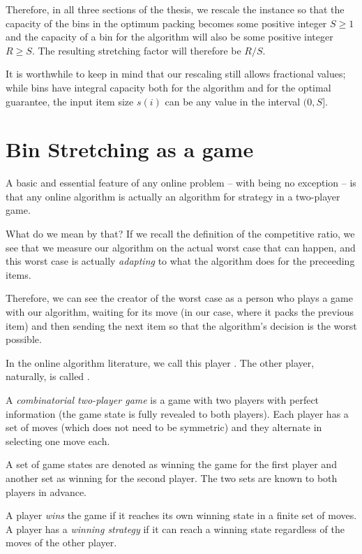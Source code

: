 Therefore, in all three sections of the thesis, we rescale the
instance so that the capacity of the bins in the optimum packing
becomes some positive integer $S \ge 1$ and the capacity of a bin for
the algorithm will also be some positive integer $R \ge S$. The
resulting stretching factor will therefore be $R/S$.

It is worthwhile to keep in mind that our rescaling still allows
fractional values; while bins have integral capacity both for the
algorithm and for the optimal guarantee, the input item size $s(i)$
can be any value in the interval $(0,S]$.

\section{Bin Stretching as a game}\label{sec:binstretchgame}

A basic and essential feature of any online problem -- with
\binstretch being no exception -- is that any online algorithm is
actually an algorithm for strategy in a two-player game.

What do we mean by that? If we recall the definition of the
competitive ratio, we see that we measure our algorithm on the actual
worst case that can happen, and this worst case is actually
\emph{adapting} to what the algorithm does for the preceeding items.

Therefore, we can see the creator of the worst case as a person who
plays a game with our algorithm, waiting for its move (in our case,
where it packs the previous item) and then sending the next item so
that the algorithm's decision is the worst possible.

In the online algorithm literature, we call this player
\adversary. The other player, naturally, is called \algo.

\begin{dfn} 
A \emph{combinatorial two-player game} is a game with two
players with perfect information (the game state is fully revealed to
both players). Each player has a set of moves (which does not need to
be symmetric) and they alternate in selecting one move each.

A set of game states are denoted as winning the game for the first
player and another set as winning for the second player. The two sets
are known to both players in advance.

A player \emph{wins} the game if it reaches its own winning state in a
finite set of moves. A player has a \emph{winning strategy} if
it can reach a winning state regardless of the moves of the other
player.
\end{dfn}

